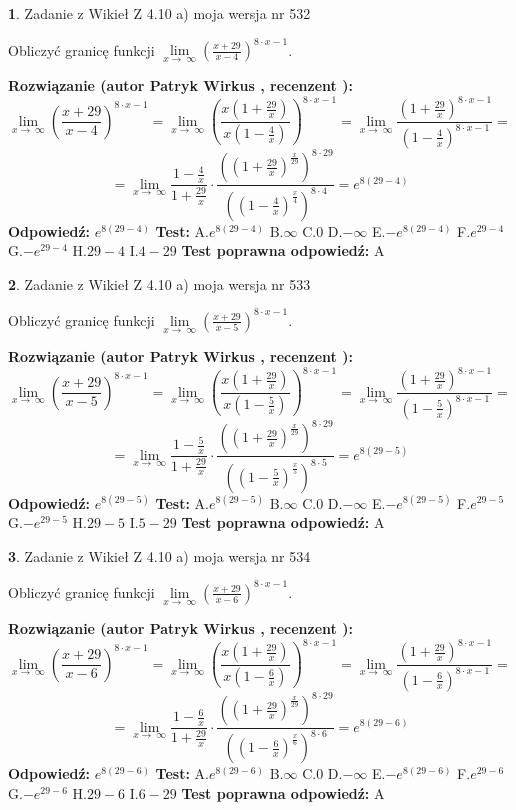 \documentclass[12pt, a4paper]{article}
\theoremstyle{definition} %
\newtheorem{zad}{}
\newcommand{\zadStart}[1]{\begin{zad}#1\newline}
\newcommand{\zadStop}{\end{zad}}
\newcommand{\rozwStart}[2]{\noindent \textbf{Rozwiązanie (autor #1 , recenzent #2): }\newline}
\newcommand{\rozwStop}{\newline}
\newcommand{\odpStart}{\noindent \textbf{Odpowiedź:}\newline}
\newcommand{\odpStop}{\newline}
\newcommand{\testStart}{\noindent \textbf{Test:}\newline}
\newcommand{\testStop}{\newline}
\newcommand{\kluczStart}{\noindent \textbf{Test poprawna odpowiedź:}\newline}
\newcommand{\kluczStop}{\newline}
\begin{document}
\zadStart{Zadanie z Wikieł Z 4.10 a) moja wersja nr 532}


Obliczyć granicę funkcji  $\lim\limits_{x\to\ \infty}(\frac{x+29}{x-4})^{8\cdot x-1}$.
\zadStop
\rozwStart{Patryk Wirkus}{}
$$\lim\limits_{x\to\ \infty}(\frac{x+29}{x-4})^{8\cdot x-1} = \lim\limits_{x\to\ \infty}(\frac{x(1+\frac{29}{x})}{x(1-\frac{4}{x})})^{8\cdot x-1}=\lim\limits_{x\to\ \infty}\frac{(1+\frac{29}{x})^{8\cdot x-1}}{(1-\frac{4}{x})^{8\cdot x-1}}=$$
$$=\lim\limits_{x\to\ \infty}\frac{1-\frac{4}{x}}{1+\frac{29}{x}}\cdot\frac{((1+\frac{29}{x})^{\frac{x}{29}})^{8\cdot29}}{((1-\frac{4}{x})^{\frac{x}{4}})^{8\cdot4}}=e^{8(29-4)}$$
\rozwStop
\odpStart
$e^{8(29-4)}$
\odpStop
\testStart
A.$e^{8(29-4)}$ B.$\infty$ C.$0$ D.$-\infty$ E.$-e^{8(29-4)}$
F.$e^{29-4}$ G.$-e^{29-4}$
H.$29-4$
I.$4-29$
\testStop
\kluczStart
A
\kluczStop



\zadStart{Zadanie z Wikieł Z 4.10 a) moja wersja nr 533}


Obliczyć granicę funkcji  $\lim\limits_{x\to\ \infty}(\frac{x+29}{x-5})^{8\cdot x-1}$.
\zadStop
\rozwStart{Patryk Wirkus}{}
$$\lim\limits_{x\to\ \infty}(\frac{x+29}{x-5})^{8\cdot x-1} = \lim\limits_{x\to\ \infty}(\frac{x(1+\frac{29}{x})}{x(1-\frac{5}{x})})^{8\cdot x-1}=\lim\limits_{x\to\ \infty}\frac{(1+\frac{29}{x})^{8\cdot x-1}}{(1-\frac{5}{x})^{8\cdot x-1}}=$$
$$=\lim\limits_{x\to\ \infty}\frac{1-\frac{5}{x}}{1+\frac{29}{x}}\cdot\frac{((1+\frac{29}{x})^{\frac{x}{29}})^{8\cdot29}}{((1-\frac{5}{x})^{\frac{x}{5}})^{8\cdot5}}=e^{8(29-5)}$$
\rozwStop
\odpStart
$e^{8(29-5)}$
\odpStop
\testStart
A.$e^{8(29-5)}$ B.$\infty$ C.$0$ D.$-\infty$ E.$-e^{8(29-5)}$
F.$e^{29-5}$ G.$-e^{29-5}$
H.$29-5$
I.$5-29$
\testStop
\kluczStart
A
\kluczStop



\zadStart{Zadanie z Wikieł Z 4.10 a) moja wersja nr 534}


Obliczyć granicę funkcji  $\lim\limits_{x\to\ \infty}(\frac{x+29}{x-6})^{8\cdot x-1}$.
\zadStop
\rozwStart{Patryk Wirkus}{}
$$\lim\limits_{x\to\ \infty}(\frac{x+29}{x-6})^{8\cdot x-1} = \lim\limits_{x\to\ \infty}(\frac{x(1+\frac{29}{x})}{x(1-\frac{6}{x})})^{8\cdot x-1}=\lim\limits_{x\to\ \infty}\frac{(1+\frac{29}{x})^{8\cdot x-1}}{(1-\frac{6}{x})^{8\cdot x-1}}=$$
$$=\lim\limits_{x\to\ \infty}\frac{1-\frac{6}{x}}{1+\frac{29}{x}}\cdot\frac{((1+\frac{29}{x})^{\frac{x}{29}})^{8\cdot29}}{((1-\frac{6}{x})^{\frac{x}{6}})^{8\cdot6}}=e^{8(29-6)}$$
\rozwStop
\odpStart
$e^{8(29-6)}$
\odpStop
\testStart
A.$e^{8(29-6)}$ B.$\infty$ C.$0$ D.$-\infty$ E.$-e^{8(29-6)}$
F.$e^{29-6}$ G.$-e^{29-6}$
H.$29-6$
I.$6-29$
\testStop
\kluczStart
A
\kluczStop
\end{document}
